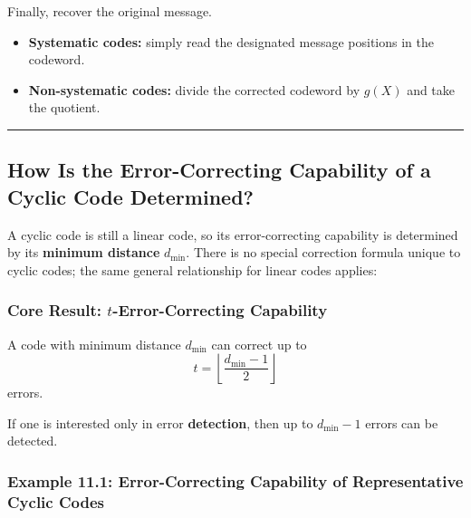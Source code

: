 \documentclass[
]{article}
\providecommand{\tightlist}{%
  \setlength{\itemsep}{0pt}\setlength{\parskip}{0pt}}
\begin{document}
Finally, recover the original message.

\begin{itemize}
\tightlist
\item
  \textbf{Systematic codes:} simply read the designated message
  positions in the codeword.
\item
  \textbf{Non-systematic codes:} divide the corrected codeword by
  \(g(X)\) and take the quotient.
\end{itemize}

\begin{center}\rule{0.5\linewidth}{0.5pt}\end{center}

\subsection{How Is the Error-Correcting Capability of a Cyclic Code
Determined?}\label{how-is-the-error-correcting-capability-of-a-cyclic-code-determined}

A cyclic code is still a linear code, so its error-correcting capability
is determined by its \textbf{minimum distance} \(d_{\min}\). There is no
special correction formula unique to cyclic codes; the same general
relationship for linear codes applies:

\subsubsection{\texorpdfstring{Core Result: \(t\)-Error-Correcting
Capability}{Core Result: t-Error-Correcting Capability}}\label{core-result-t-error-correcting-capability}

A code with minimum distance \(d_{\min}\) can correct up to
\[t = \left\lfloor \frac{d_{\min}-1}{2} \right\rfloor\] errors.

If one is interested only in error \textbf{detection}, then up to
\(d_{\min}-1\) errors can be detected.

\subsubsection{Example 11.1: Error-Correcting Capability of
Representative Cyclic
Codes}\label{example-11.1-error-correcting-capability-of-representative-cyclic-codes}
\end{document}
